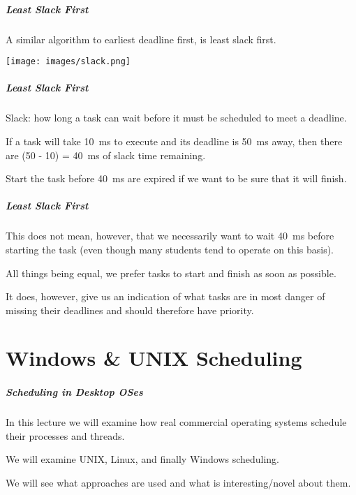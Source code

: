 \begin{frame}
\frametitle{Least Slack First}

A similar algorithm to earliest deadline first, is least slack first.

\begin{center}
	\texttt{[image: images/slack.png]}
\end{center}


\end{frame}

\begin{frame}
\frametitle{Least Slack First}

\alert{Slack}: how long a task can wait before it must be scheduled to meet a deadline.

If a task will take 10~ms to execute and its deadline is 50~ms away, then there are (50 - 10) = 40~ms of slack time remaining.

Start the task before 40~ms are expired if we want to be sure that it will finish. 

\end{frame}



\begin{frame}
\frametitle{Least Slack First}
This does not mean, however, that we necessarily want to wait 40~ms before starting the task (even though many students tend to operate on this basis). 

All things being equal, we prefer tasks to start and finish as soon as possible. 

It does, however, give us an indication of what tasks are in most danger of missing their deadlines and should therefore have priority.

\end{frame}

\part{Windows \& UNIX Scheduling}

\begin{frame}
\partpage
\end{frame}

\begin{frame}
\frametitle{Scheduling in Desktop OSes}

In this lecture we will examine how real commercial operating systems schedule their processes and threads. 

We will examine UNIX, Linux, and finally Windows scheduling. 

We will see what approaches are used and what is interesting/novel about them.


\end{frame}

